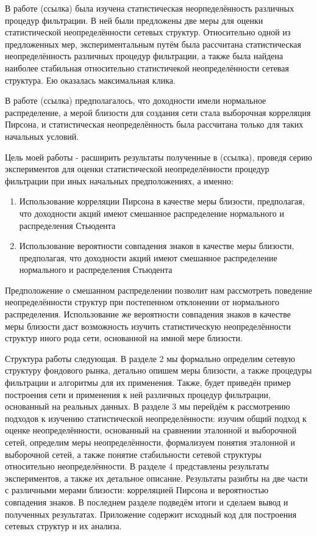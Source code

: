 В работе (ссылка) была изучена статистическая неорпеделённость различных процедур фильтрации. В ней были предложены две меры для оценки статистической неопределённости сетевых структур. Относительно одной из предложенных мер, экспериментальным путём была рассчитана статистическая неопределённость различных процедур фильтрации, а также была найдена наиболее стабильная относительно статистичекой неопределённости сетевая структура. Ею оказалась максимальная клика. 

В работе (ссылка) предполагалось, что доходности имели нормальное распределение, а мерой близости для создания сети стала выборочная корреляция Пирсона, и статистическая неопределённость была рассчитана только для таких начальных условий.

Цель моей работы - расширить результаты полученные в (ссылка), проведя серию экспериментов для оценки статистической неопределённости процедур фильтрации при иных начальных предположениях, а именно:
\begin{enumerate}
	\item Использование корреляции Пирсона в качестве меры близости, предполагая, что доходности акций имеют смешанное распределение нормального и распределения Стьюдента
	\item Использование вероятности совпадения знаков в качестве меры близости, предполагая, что доходности акций имеют смешанное распределение нормального и распределения Стьюдента
\end{enumerate}

Предположение о смешанном распределении позволит нам рассмотреть поведение неопределённости структур при постепенном отклонении от нормального распределения. Использование же вероятности совпадения знаков в качестве меры близости даст возможность изучить статистическую неопределённости структур  иного рода сети, основанной на имной мере близости.

Структура работы следующая. В разделе 2 мы формально определим сетевую структуру фондового рынка, детально опишем меры близости, а также процедуры фильтрации и алгоритмы для их применения. Также, будет приведён пример построения сети и применения к ней различных процедур фильтрации, основанный на реальных данных. В разделе 3 мы перейдём к рассмотрению подходов к изучению статистической неопределённости: изучим общий подход к оценке неопределённости, основанный на сравнении эталонной и выборочной сетей, определим меры неопределённости, формализуем понятия эталонной и выборочной сетей, а также понятие стабильности сетевой структуры относительно неопределённости. В разделе 4 представлены результаты экспериментов, а также их детальное описание. Результаты разибты на две части с различными мерами близости: корреляцией Пирсона и вероятностью совпадения знаков. В последнем разделе подведём итоги и сделаем вывод и полученных результатах. Приложение содержит исходный код для построения сетевых структур и их анализа.


